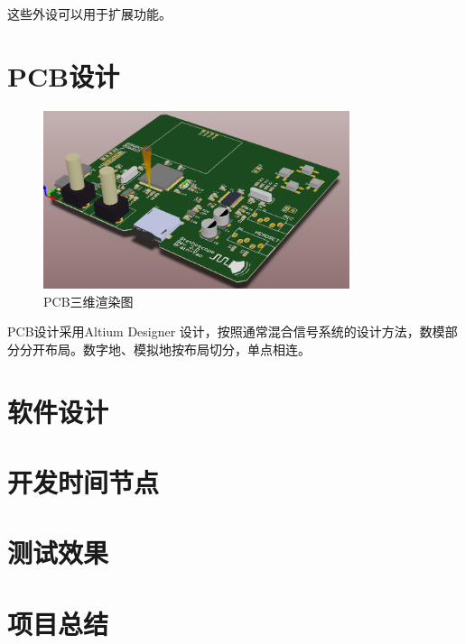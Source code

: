 \documentclass[16pt,a4paper]{article}
\begin{document}
这些外设可以用于扩展功能。

\section{PCB设计}
\begin{figure}[H]
\centering
\includegraphics[width=0.8\textwidth]{pcb3D.png}
\caption{PCB三维渲染图} 
\end{figure}
PCB设计采用Altium Designer 设计，按照通常混合信号系统的设计方法，数模部分分开布局。数字地、模拟地按布局切分，单点相连。


\section{软件设计}

\section{开发时间节点}

\section{测试效果}

\section{项目总结}
\end{document}
